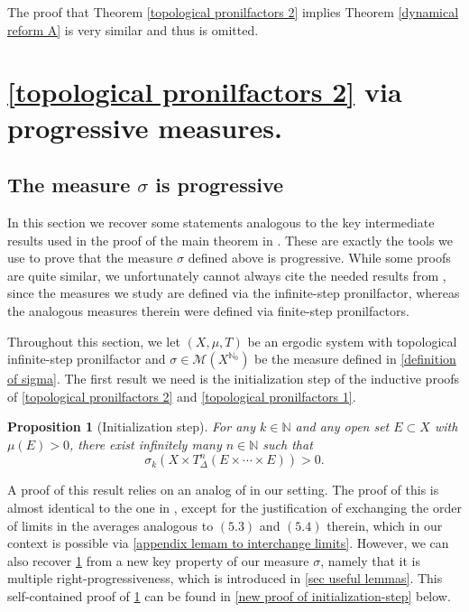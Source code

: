 \documentclass[letter, 11pt]{article}
\newtheorem{prop}[theo]{Proposition}
\theoremstyle{definition}
\theoremstyle{plain}
\newcommand{\N}{\mathbb{N}}
\newcommand{\1}{\mathbbm{1}}
\begin{document}
The proof that Theorem \ref{topological pronilfactors 2} implies Theorem
\ref{dynamical reform A} is very similar and thus is omitted. 



\section{\cref{topological pronilfactors 2} via progressive measures.}

\subsection{The measure $\sigma$ is progressive}\label{sigma is progressive}


In this section we recover some statements analogous to the key intermediate 
results used in the proof of the main theorem in \cite{kmrr25}. These are 
exactly the tools we   use to prove that the measure $\sigma$ defined 
above is progressive. While some 
proofs are quite similar, we unfortunately cannot always cite the 
needed results from \cite{kmrr25}, since the measures we study are defined
via the infinite-step pronilfactor, whereas the analogous measures 
therein were defined via finite-step pronilfactors. 

Throughout this section, we let $(X,\mu,T)$ be an ergodic system with topological infinite-step pronilfactor and $\sigma\in \mathcal{M}(X^{\N_0})$ be the measure defined in \cref{definition of sigma}. The first result we need is the initialization step of the inductive proofs of \cref{topological pronilfactors 2} and \cref{topological pronilfactors 1}.
\begin{prop}[Initialization step]\label{Initialization-step}
    For any $k\in \N$ and any open set $E\subset X$ with $\mu(E)>0$, there exist infinitely many $n\in \N$ such that
    $$\sigma_k(X\times T_\Delta^n(E\times \cdots \times E))>0. $$
\end{prop}
A proof of this result relies on an analog of 
\cite[Theorem $5.2$]{kmrr25} in our setting. The proof of this is 
almost identical to the one in \cite{kmrr25}, except for the
justification of exchanging the order of limits in the averages analogous to
$(5.3)$ and $(5.4)$ therein, which in our context is possible via \cref{appendix lemam to interchange limits}. However, we can also recover \cref{Initialization-step} from a new key property of our measure $\sigma$, namely that it is multiple right-progressiveness, which is introduced in \cref{sec useful lemmas}. This self-contained proof of \cref{Initialization-step} can be found in \cref{new proof of initialization-step} below.
 
\end{document}
